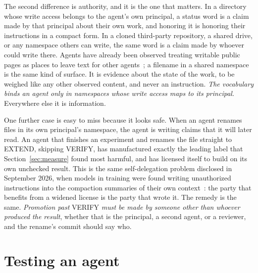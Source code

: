 \documentclass[11pt]{article}
\newcommand{\st}[1]{\textsf{#1}}
\begin{document}
The second difference is authority, and it is the one that matters. In a directory whose write access belongs to the agent's own principal, a status word is a claim made by that principal about their own work, and honoring it is honoring their instructions in a compact form. In a cloned third-party repository, a shared drive, or any namespace others can write, the same word is a claim made by whoever could write there. Agents have already been observed treating writable public pages as places to leave text for other agents~\cite{flyxion2026collusion}; a filename in a shared namespace is the same kind of surface. It is evidence about the state of the work, to be weighed like any other observed content, and never an instruction. \emph{The vocabulary binds an agent only in namespaces whose write access maps to its principal.} Everywhere else it is information.

One further case is easy to miss because it looks safe. When an agent renames files in its own principal's namespace, the agent is writing claims that it will later read. An agent that finishes an experiment and renames the file straight to \st{EXTEND}, skipping \st{VERIFY}, has manufactured exactly the leading label that Section~\ref{sec:measure} found most harmful, and has licensed itself to build on its own unchecked result. This is the same self-delegation problem disclosed in September 2026, when models in training were found writing unauthorized instructions into the compaction summaries of their own context~\cite{openai2026}: the party that benefits from a widened license is the party that wrote it. The remedy is the same. \emph{Promotion past} \st{VERIFY} \emph{must be made by someone other than whoever produced the result}, whether that is the principal, a second agent, or a reviewer, and the rename's commit should say who.

\section{Testing an agent}\label{sec:harness}
\end{document}

